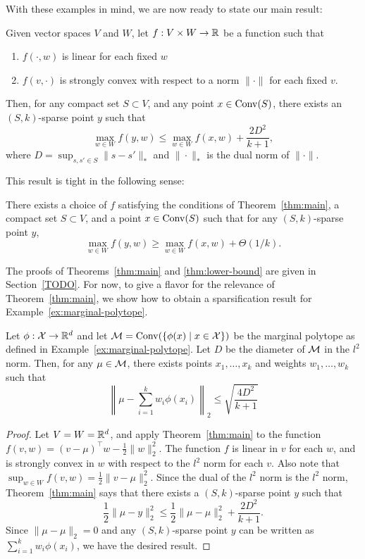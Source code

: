 \documentclass[paper.tex]{subfiles}
\begin{document}
With these examples in mind, we are now ready to state our main result:
\begin{theorem}
\label{thm:main}
Given vector spaces $V$ and $W$, let $f : V \times W \to \mathbb R$ be a function 
such that 
\begin{enumerate}
\item $f(\cdot,w)$ is linear for each fixed $w$
\item $f(v, \cdot)$ is strongly convex with respect to a norm $\|\cdot\|$ 
      for each fixed $v$.
\end{enumerate}
Then, for any compact set $S \subset V$, and any point $x \in \operatorname{Conv}(S)$, 
there exists an $(S,k)$-sparse point $y$ such that 
\[ \max_{w \in W} f(y,w) \leq \max_{w \in W} f(x,w) + \frac{2D^2}{k+1}, \]
where $D = \sup_{s, s' \in S} \|s-s'\|_*$ and $\|\cdot\|_*$ is the dual norm 
of $\|\cdot\|$.
\end{theorem}
This result is tight in the following sense:
\begin{theorem}
\label{thm:lower-bound}
There exists a choice of $f$ satisfying the conditions of Theorem~\ref{thm:main}, 
a compact set $S \subset V$, and a point $x \in \operatorname{Conv}(S)$ such that for any 
$(S,k)$-sparse point $y$, 
\[ \max_{w \in W} f(y,w) \ge \max_{w \in W} f(x,w) + \Theta(1/k). \]
\end{theorem}
The proofs of Theorems~\ref{thm:main} and \ref{thm:lower-bound} are given in Section~\ref{TODO}. For now, 
to give a flavor for the relevance of Theorem~\ref{thm:main}, we show how 
to obtain a sparsification result for Example~\ref{ex:marginal-polytope}.
\begin{proposition}
\label{prop:pseudosamples}
Let $\phi : \mathcal{X} \to \mathbb R^d$ and let $\mathcal{M} = \operatorname{Conv}(\{\phi(x) \mid x \in \mathcal{X}\})$ 
be the marginal polytope as defined in Example~\ref{ex:marginal-polytope}. 
Let $D$ be the diameter of $\mathcal{M}$ in the $l^2$ norm. Then, for any 
$\mu \in \mathcal{M}$, there exists points $x_1,\ldots,x_k$ and weights 
$w_1,\ldots,w_k$ such that
\[ \left\|\mu - \sum_{i=1}^k w_i \phi(x_i)\right\|_2 \leq \sqrt{\frac{4D^2}{k+1}} \]
\end{proposition}
\begin{proof}
Let $V = W = \mathbb R^d$, and apply Theorem~\ref{thm:main} to the function 
$f(v,w) = (v-\mu)^{\top}w - \frac{1}{2}\|w\|_2^2$. The function $f$ is 
linear in $v$ for each $w$, and is strongly convex in $w$ with respect to the 
$l^2$ norm for each $v$. Also note that 
$\sup_{w \in W} f(v,w) = \frac{1}{2}\|v-\mu\|_2^2$. Since the dual of the 
$l^2$ norm is the $l^2$ norm, Theorem~\ref{thm:main} says that there exists 
a $(S,k)$-sparse point $y$ such that
\[ \frac{1}{2}\|\mu - y\|_2^2 \leq \frac{1}{2}\|\mu - \mu\|_2^2 + \frac{2D^2}{k+1}. \]
Since $\|\mu-\mu\|_2 = 0$ and any $(S,k)$-sparse point $y$ can be written 
as $\sum_{i=1}^k w_i \phi(x_i)$, we have the desired result.
\end{proof}
\end{document}
